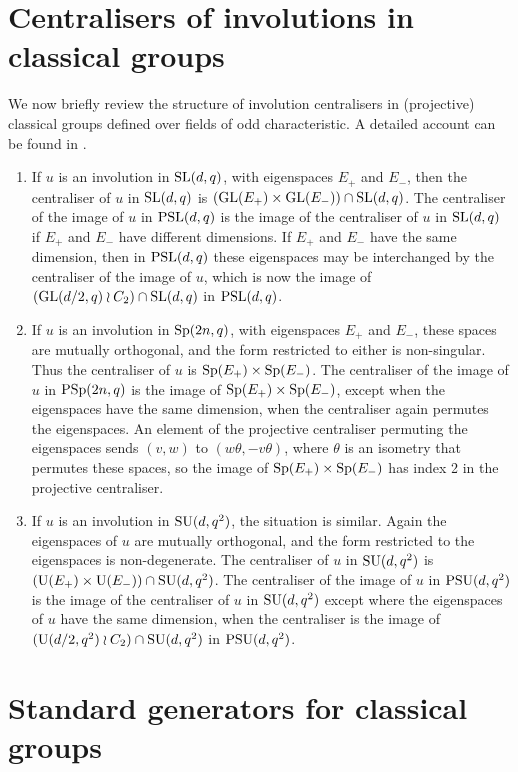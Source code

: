 \documentclass[12pt]{article}
\def\SL{{\rm SL}}
\def\GL{{\rm GL}}
\def\U{{\rm U}}
\def\PSL{{\rm PSL}}
\def\PSp{{\rm PSp}}
\def\PSU{{\rm PSU}}
\def\Sp{{\rm Sp}}
\def\SU{{\rm SU}}
\begin{document}
\section{Centralisers of involutions in classical groups}\label{cent} 
We now briefly review the structure of involution centralisers 
in (projective) classical groups 
defined over fields of odd characteristic.
A detailed account can be found in \cite{GLS3}.
\begin{enumerate}
\item 
If $u$ is an involution in $\SL(d,q)$, with eigenspaces $E_+$ and
$E_-$, then the centraliser of $u$ in $\SL(d,q)$ is
$(\GL(E_+)\times\GL(E_-))\cap\SL(d,q)$. The centraliser of the
image of $u$ in $\PSL(d,q)$ is the image of the centraliser of $u$ in
$\SL(d,q)$ if $E_+$ and $E_-$ have different dimensions. If
$E_+$ and $E_-$ have the same dimension, then in $\PSL(d,q)$ these
eigenspaces may be interchanged by the centraliser of the image of
$u$, which is now the image of $(\GL(d/2,q)\wr C_2)\cap\SL(d,q)$ in
$\PSL(d,q)$.

\item 
If $u$ is an involution in $\Sp(2n,q)$, with eigenspaces $E_+$ and
$E_-$, these spaces are  mutually orthogonal, and the form restricted
to either is non-singular. Thus the centraliser of $u$ is 
$\Sp(E_+) \times \Sp(E_-)$. The centraliser of the image of $u$ in
$\PSp(2n,q)$ is the image of $\Sp(E_+)\times\Sp(E_-)$, except when the
eigenspaces have the same dimension, when the centraliser again
permutes the eigenspaces. An element of the projective
centraliser permuting the eigenspaces sends $(v,w)$ to
$(w\theta,-v\theta)$, where  $\theta$ is an isometry that permutes
these spaces, so the image of $\Sp(E_+)\times\Sp(E_-)$ has index 2
in the projective centraliser.

\item 
If $u$ is an involution in $\SU(d,q^2)$, the situation is similar.
Again the eigenspaces of $u$ are mutually orthogonal, and the form
restricted to the eigenspaces is non-degenerate. The centraliser of
$u$ in $\SU(d,q^2)$  is $(\U(E_+)\times\U(E_-))\cap\SU(d,q^2)$. The
centraliser of the image of $u$ in $\PSU(d,q^2)$ is the image of the
centraliser of $u$ in $\SU(d,q^2)$  except where the eigenspaces of
$u$ have the same dimension, when the centraliser is the image of
$(\U(d/2,q^2)\wr C_2)\cap\SU(d,q^2)$ in $\PSU(d,q^2)$.
\end{enumerate}

\section{Standard generators for classical groups}
\label{standard}
\end{document}

